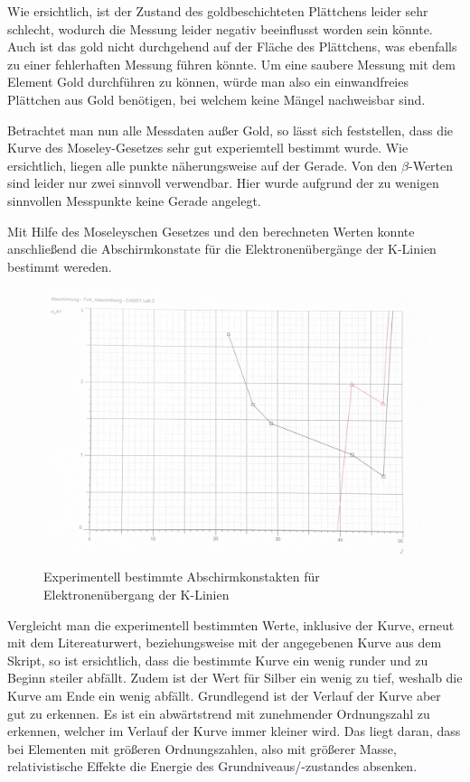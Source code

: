 \documentclass{article}
\begin{document}
\begin{enumerate}
Wie ersichtlich, ist der Zustand des goldbeschichteten Plättchens leider sehr schlecht, wodurch die Messung leider negativ beeinflusst worden sein könnte. Auch ist das gold nicht durchgehend auf der Fläche des Plättchens, was ebenfalls zu einer fehlerhaften Messung führen könnte. Um eine saubere Messung mit dem Element Gold durchführen zu können, würde man also ein einwandfreies Plättchen aus Gold benötigen, bei welchem keine Mängel nachweisbar sind.

Betrachtet man nun alle Messdaten außer Gold, so lässt sich feststellen, dass die Kurve des Moseley-Gesetzes sehr gut experiemtell bestimmt wurde. Wie ersichtlich, liegen alle punkte näherungsweise auf der Gerade. Von den $\beta$-Werten sind leider nur zwei sinnvoll verwendbar. Hier wurde aufgrund der zu wenigen sinnvollen Messpunkte keine Gerade angelegt.

Mit Hilfe des Moseleyschen Gesetzes und den berechneten Werten konnte anschließend die Abschirmkonstate für die Elektronenübergänge der K-Linien bestimmt wereden.

\begin{figure}[H]
    \centering
    \includegraphics[width=0.7\linewidth]{Abbildungen/Abschirm.png}
    \caption{Experimentell bestimmte Abschirmkonstakten für Elektronenübergang der K-Linien}
\end{figure}

Vergleicht man die experimentell bestimmten Werte, inklusive der Kurve, erneut mit dem Litereaturwert, beziehungsweise mit der angegebenen Kurve aus dem Skript, so ist ersichtlich, dass die bestimmte Kurve ein wenig runder und zu Beginn steiler abfällt. Zudem ist der Wert für Silber ein wenig zu tief, weshalb die Kurve am Ende ein wenig abfällt. Grundlegend ist der Verlauf der Kurve aber gut zu erkennen. Es ist ein abwärtstrend mit zunehmender Ordnungszahl zu erkennen, welcher im Verlauf der Kurve immer kleiner wird. Das liegt daran, dass bei Elementen mit größeren Ordnungszahlen, also mit größerer Masse, relativistische Effekte die Energie des Grundniveaus/-zustandes absenken. 


\end{enumerate}
\end{document}
